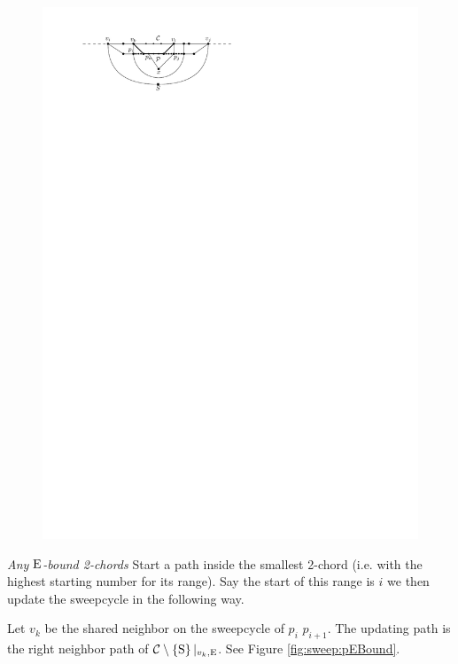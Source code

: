     \begin{figure}[h]
      \centering
      \includegraphics[scale=1]{unifiedAlgo/img/sweep/2chordInChordUpdate}
      \caption{}
      \label{fig:sweep:2chordInChordUpdate}
    \end{figure}

    \emph{Any $\mathrm{E}$-bound 2-chords}
    Start a path inside the smallest 2-chord (i.e. with the highest starting number for its range). Say the start of this range is $i$ we then update the sweepcycle in the following way.

    Let $v_k$ be the shared neighbor on the sweepcycle of $p_{i}$ $p_{i +1}$. The updating path is the right neighbor path of $\mathcal{C} \setminus \left\lbrace {\mathrm{S}} \right\rbrace|_{v_k, \mathrm{E}}$. See Figure \ref{fig:sweep:pEBound}.

